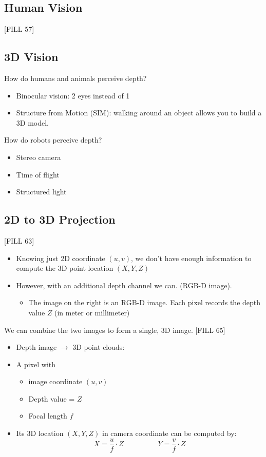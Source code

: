 \documentclass[10pt]{article}
\begin{document}
\subsection*{Human Vision}
[FILL 57]

\subsection*{3D Vision}
How do humans and animals perceive depth?
\begin{itemize}
	\item Binocular vision: 2 eyes instead of 1
	\item Structure from Motion (SIM): walking around an object allows you to build a 3D model.
\end{itemize}
How do robots perceive depth?
\begin{itemize}
	\item Stereo camera
	\item Time of flight
	\item Structured light
\end{itemize}

\subsection*{2D to 3D Projection}
[FILL 63]
\begin{itemize}
	\item Knowing just 2D coordinate $(u, v)$, we don't have enough information to compute the 3D point location $(X, Y, Z)$
	\item However, with an additional depth channel we can. (RGB-D image).
	\begin{itemize}
        \item The image on the right is an RGB-D image.  Each pixel records the depth value $Z$ (in meter or millimeter)
    \end{itemize}
\end{itemize}
We can combine the two images to form a single, 3D image.
[FILL 65]
\begin{itemize}
	\item Depth image $\rightarrow$ 3D point clouds:
	\item A pixel with
	\begin{itemize}
        \item image coordinate $(u, v)$
        \item Depth value = $Z$
        \item Focal length $f$
    \end{itemize} 
    \item Its 3D location $(X, Y, Z)$ in camera coordinate can be computed by:
    \[X = \frac{u}{f} \cdot Z \hspace{2cm} Y = \frac{v}{f} \cdot Z\]
\end{itemize}
\end{document}
